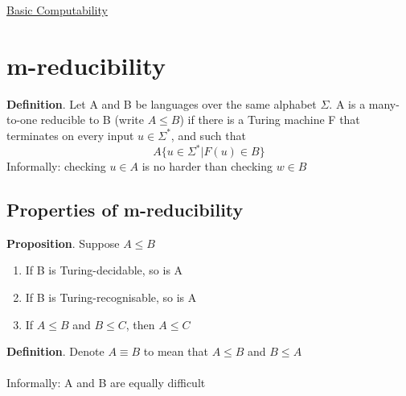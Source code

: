 \documentclass{article}[18pt]
\begin{document}
\begin{center}
\underline{\huge Basic Computability}
\end{center}
\section{m-reducibility}
\textbf{Definition}. Let A and B be languages over the same alphabet $\Sigma$. A is a many-to-one reducible to B (write $A\leqslant B$) if there is a Turing machine F that terminates on every input $u\in \Sigma^*$, and such that
$$A\{u\in \Sigma^*|F(u)\in B\}$$
Informally: checking $u\in A$ is no harder than checking $w\in B$
\subsection{Properties of m-reducibility}
\textbf{Proposition}. Suppose $A\leqslant B$
\begin{enumerate}
	\item If B is Turing-decidable, so is A
	\item If B is Turing-recognisable, so is A
	\item If $A\leqslant B$ and $B\leqslant C$, then $A\leqslant C$
\end{enumerate}
\textbf{Definition}. Denote $A\equiv B$ to mean that $A\leqslant B$ and $B\leqslant A$\\
\\
Informally: A and B are equally difficult
\end{document}
